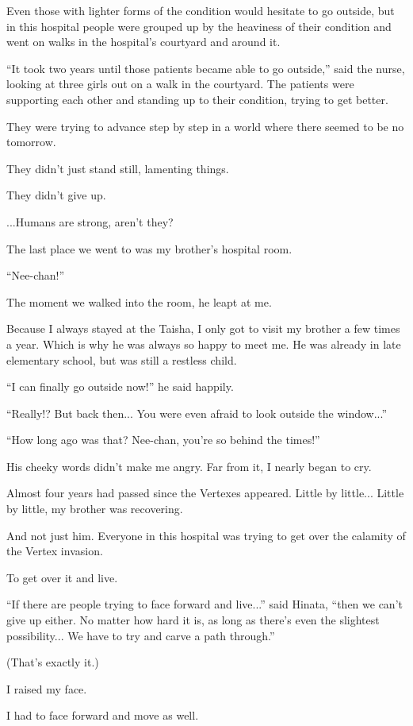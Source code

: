 Even those with lighter forms of the condition would hesitate to go outside, but in this hospital people were grouped up by the heaviness of their condition and went on walks in the hospital's courtyard and around it.

``It took two years until those patients became able to go outside,'' said the nurse, looking at three girls out on a walk in the courtyard. The patients were supporting each other and standing up to their condition, trying to get better.

They were trying to advance step by step in a world where there seemed to be no tomorrow.

They didn't just stand still, lamenting things.

They didn't give up.

...Humans are strong, aren't they?

The last place we went to was my brother's hospital room.

``Nee-chan!''

The moment we walked into the room, he leapt at me.

Because I always stayed at the Taisha, I only got to visit my brother a few times a year. Which is why he was always so happy to meet me. He was already in late elementary school, but was still a restless child.

``I can finally go outside now!'' he said happily.

``Really!? But back then... You were even afraid to look outside the window...''

``How long ago was that? Nee-chan, you're so behind the times!''

His cheeky words didn't make me angry. Far from it, I nearly began to cry.

Almost four years had passed since the Vertexes appeared. Little by little... Little by little, my brother was recovering.

And not just him. Everyone in this hospital was trying to get over the calamity of the Vertex invasion.

To get over it and live.

``If there are people trying to face forward and live...'' said Hinata, ``then we can't give up either. No matter how hard it is, as long as there's even the slightest possibility... We have to try and carve a path through.''

(That's exactly it.)

I raised my face.

I had to face forward and move as well.

